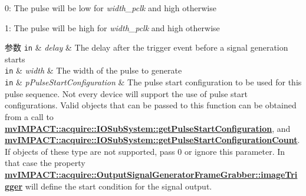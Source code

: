 \begin{DoxyItemize}
\item 0\+: The pulse will be low for {\itshape width\+\_\+pclk} and high otherwise
\item 1\+: The pulse will be high for {\itshape width\+\_\+pclk} and high otherwise 
\begin{DoxyParams}[1]{参数}
\mbox{\tt in}  & {\em delay} & The delay after the trigger event before a signal generation starts \\
\hline
\mbox{\tt in}  & {\em width} & The width of the pulse to generate \\
\hline
\mbox{\tt in}  & {\em p\+Pulse\+Start\+Configuration} & The pulse start configuration to be used for this pulse sequence. Not every device will support the use of pulse start configurations. Valid objects that can be passed to this function can be obtained from a call to {\bfseries \hyperlink{classmv_i_m_p_a_c_t_1_1acquire_1_1_i_o_sub_system_af699c6e691ece416ec2242d08e35cb58}{mv\+I\+M\+P\+A\+C\+T\+::acquire\+::\+I\+O\+Sub\+System\+::get\+Pulse\+Start\+Configuration}}, and {\bfseries \hyperlink{classmv_i_m_p_a_c_t_1_1acquire_1_1_i_o_sub_system_a6f33bc4f6613b7c8b268beba61a09661}{mv\+I\+M\+P\+A\+C\+T\+::acquire\+::\+I\+O\+Sub\+System\+::get\+Pulse\+Start\+Configuration\+Count}}. If objects of these type are not supported, pass 0 or ignore this parameter. In that case the property {\bfseries \hyperlink{classmv_i_m_p_a_c_t_1_1acquire_1_1_output_signal_generator_frame_grabber_a7b84a665907ea8d08f8dbf0be76f8388}{mv\+I\+M\+P\+A\+C\+T\+::acquire\+::\+Output\+Signal\+Generator\+Frame\+Grabber\+::image\+Trigger}} will define the start condition for the signal output. \\
\hline
\end{DoxyParams}

\end{DoxyItemize}\hypertarget{classmv_i_m_p_a_c_t_1_1acquire_1_1_output_signal_generator_frame_grabber_a10d99336c129dae39d28b1c53795f00e}{
}
